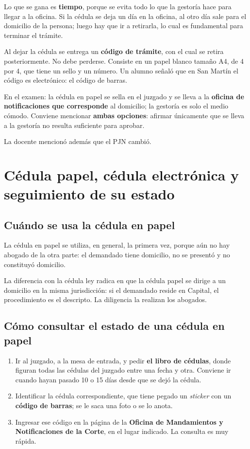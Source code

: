 \documentclass[12pt,oneside]{book}
\begin{document}
Lo que se gana es \textbf{tiempo}, porque se evita todo lo que la gestoría hace para llegar a la oficina. Si la cédula se deja un día en la oficina, al otro día sale para el domicilio de la persona; luego hay que ir a retirarla, lo cual es fundamental para terminar el trámite.

Al dejar la cédula se entrega un \textbf{código de trámite}, con el cual se retira posteriormente. No debe perderse. Consiste en un papel blanco tamaño A4, de 4 por 4, que tiene un sello y un número. Un alumno señaló que en San Martín el código es electrónico: el código de barras.

\begin{important}
En el examen: la cédula en papel se sella en el juzgado y se lleva a la \textbf{oficina de notificaciones que corresponde} al domicilio; la gestoría es solo el medio cómodo. Conviene mencionar \textbf{ambas opciones}: afirmar únicamente que se lleva a la gestoría no resulta suficiente para aprobar.
\end{important}

La docente mencionó además que el PJN cambió.

\section{Cédula papel, cédula electrónica y seguimiento de su estado}

\subsection{Cuándo se usa la cédula en papel}

La cédula en papel se utiliza, en general, la primera vez, porque aún no hay abogado de la otra parte: el demandado tiene domicilio, no se presentó y no constituyó domicilio.

La diferencia con la cédula ley radica en que la cédula papel se dirige a un domicilio en la misma jurisdicción: si el demandado reside en Capital, el procedimiento es el descripto. La diligencia la realizan los abogados.

\subsection{Cómo consultar el estado de una cédula en papel}

\begin{enumerate}
    \item Ir al juzgado, a la mesa de entrada, y pedir \textbf{el libro de cédulas}, donde figuran todas las cédulas del juzgado entre una fecha y otra. Conviene ir cuando hayan pasado 10 o 15 días desde que se dejó la cédula.
    \item Identificar la cédula correspondiente, que tiene pegado un \textit{sticker} con un \textbf{código de barras}; se le saca una foto o se lo anota.
    \item Ingresar ese código en la página de la \textbf{Oficina de Mandamientos y Notificaciones de la Corte}, en el lugar indicado. La consulta es muy rápida.
\end{enumerate}
\end{document}
